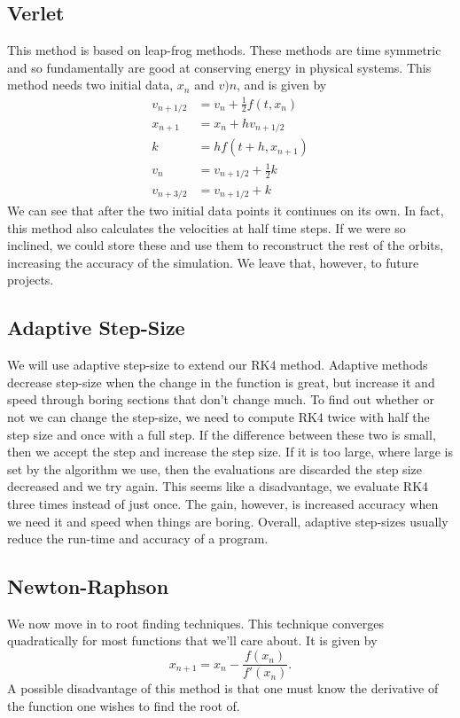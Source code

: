 \documentclass{article}
\begin{document}
\subsection*{Verlet}
This method is based on leap-frog methods. These methods are time symmetric and so fundamentally are good at conserving energy in physical systems. This method needs two initial data, $x_n$ and $v)n$, and is given by
\begin{equation}
\begin{split}
v_{n+1/2} & = v_n + \frac{1}{2}f(t,x_n) \\
x_{n+1} & = x_n +h v_{n+1/2} \\ 
k & = h f(t+h, x_{n+1}) \\ 
v_n & = v_{n+1/2} + \frac{1}{2}k  \\
v_{n+3/2} & = v_{n+1/2} +k 
\end{split}
\end{equation}
We can see that after the two initial data points it continues on its own. In fact, this method also calculates the velocities at half time steps. If we were so inclined, we could store these and use them to reconstruct the rest of the orbits, increasing the accuracy of the simulation. We leave that, however, to future projects. 

\subsection*{Adaptive Step-Size}
We will use adaptive step-size to extend our RK4 method. Adaptive methods decrease step-size when the change in the function is great, but increase it and speed through boring sections that don't change much. To find out whether or not we can change the step-size, we need to compute RK4 twice with half the step size and once with a full step. If the difference between these two is small, then we accept the step and increase the step size. If it is too large, where large is set by the algorithm we use, then the evaluations are discarded the step size decreased and we try again. This seems like a disadvantage, we evaluate RK4 three times instead of just once. The gain, however, is increased accuracy when we need it and speed when things are boring. Overall, adaptive step-sizes usually reduce the run-time and accuracy of a program. 

\subsection*{Newton-Raphson}
We now move in to root finding techniques. This technique converges quadratically for most functions that we'll care about. It is given by
\begin{equation}
    x_{n+1} = x_n - \frac{f(x_n)}{f'(x_n)}.
\end{equation}
A possible disadvantage of this method is that one must know the derivative of the function one wishes to find the root of. 
\end{document}
